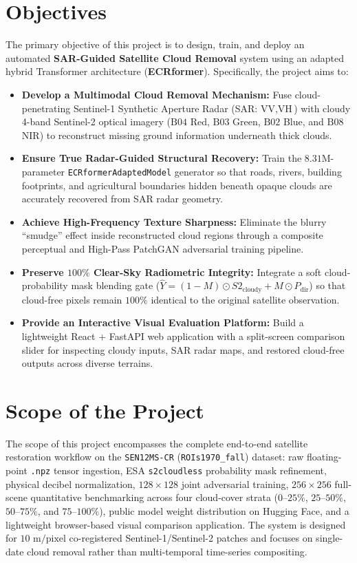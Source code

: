 \documentclass[12pt,a4paper]{report}
\begin{document}
\section{Objectives}
The primary objective of this project is to design, train, and deploy an automated \textbf{SAR-Guided Satellite Cloud Removal} system using an adapted hybrid Transformer architecture (\textbf{ECRformer}). Specifically, the project aims to:
\begin{itemize}
    \item \textbf{Develop a Multimodal Cloud Removal Mechanism:} Fuse cloud-penetrating Sentinel-1 Synthetic Aperture Radar (SAR: $\text{VV}, \text{VH}$) with cloudy 4-band Sentinel-2 optical imagery ($\text{B04}$ Red, $\text{B03}$ Green, $\text{B02}$ Blue, and $\text{B08}$ NIR) to reconstruct missing ground information underneath thick clouds.
    \item \textbf{Ensure True Radar-Guided Structural Recovery:} Train the $8.31\text{M}$-parameter \texttt{ECRformerAdaptedModel} generator so that roads, rivers, building footprints, and agricultural boundaries hidden beneath opaque clouds are accurately recovered from SAR radar geometry.
    \item \textbf{Achieve High-Frequency Texture Sharpness:} Eliminate the blurry ``smudge'' effect inside reconstructed cloud regions through a composite perceptual and High-Pass PatchGAN adversarial training pipeline.
    \item \textbf{Preserve $100\%$ Clear-Sky Radiometric Integrity:} Integrate a soft cloud-probability mask blending gate ($\hat{Y} = (1-M)\odot S2_{\text{cloudy}} + M\odot P_{\text{dir}}$) so that cloud-free pixels remain $100\%$ identical to the original satellite observation.
    \item \textbf{Provide an Interactive Visual Evaluation Platform:} Build a lightweight React + FastAPI web application with a split-screen comparison slider for inspecting cloudy inputs, SAR radar maps, and restored cloud-free outputs across diverse terrains.
\end{itemize}

\section{Scope of the Project}
The scope of this project encompasses the complete end-to-end satellite restoration workflow on the \texttt{SEN12MS-CR} (\texttt{ROIs1970\_fall}) dataset: raw floating-point \texttt{.npz} tensor ingestion, ESA \texttt{s2cloudless} probability mask refinement, physical decibel normalization, $128\times 128$ joint adversarial training, $256\times 256$ full-scene quantitative benchmarking across four cloud-cover strata ($0$--$25\%$, $25$--$50\%$, $50$--$75\%$, and $75$--$100\%$), public model weight distribution on Hugging Face, and a lightweight browser-based visual comparison application. The system is designed for $10\text{ m/pixel}$ co-registered Sentinel-1/Sentinel-2 patches and focuses on single-date cloud removal rather than multi-temporal time-series compositing.
\end{document}
